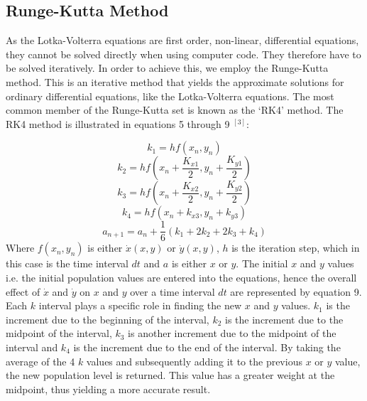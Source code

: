 \documentclass[11pt]{elsarticle}
\begin{document}
\subsection*{\textbf{Runge-Kutta Method}}

As the Lotka-Volterra equations are first order, non-linear, differential equations, they cannot be solved directly when using computer code. They therefore have to be solved iteratively. In order to achieve this, we employ the Runge-Kutta method. This is an iterative method that yields the approximate solutions for ordinary differential equations, like the Lotka-Volterra equations. The most common member of the Runge-Kutta set is known as the `RK4' method. The RK4 method is illustrated in equations 5 through 9 $^{[3]}$:

\begin{equation}
k_1=hf\left ( x_n,y_n \right )
\end{equation}
\begin{equation}
k_2=hf\left ( x_n+\frac{K_{x1}}{2},y_n+\frac{K_{y1}}{2} \right )
\end{equation}
\begin{equation}
k_3=hf\left ( x_n+\frac{K_{x2}}{2},y_n+\frac{K_{y2}}{2} \right )
\end{equation}
\begin{equation}
k_4=hf\left ( x_n+k_{x3},y_n+k_{y3} \right )
\end{equation}
\begin{equation}
a_{n+1}=a_n + \frac{1}{6}\left (k_1+2k_2+2k_3+k_4  \right )
\end{equation}
Where $f\left ( x_n,y_n \right )$ is either $\dot{x}\left ( x,y \right )$ or $\dot{y}\left ( x,y \right )$, $h$ is the iteration step, which in this case is the time interval $dt$ and $a$ is either $x$ or $y$. The initial $x$ and $y$ values i.e. the initial population values are entered into the equations, hence the overall effect of $\dot{x}$ and $\dot{y}$ on $x$ and $y$ over a time interval $dt$ are represented by equation 9. Each $k$ interval plays a specific role in finding the new $x$ and $y$ values. $k_1$ is the increment due to the beginning of the interval, $k_2$ is the increment due to the midpoint of the interval, $k_3$ is another increment due to the midpoint of the interval and $k_4$ is the increment due to the end of the interval. By taking the average of the 4 $k$ values and subsequently adding it to the previous $x$ or $y$ value, the new population level is returned. This value has a greater weight at the midpoint, thus yielding a more accurate result.
\end{document}
